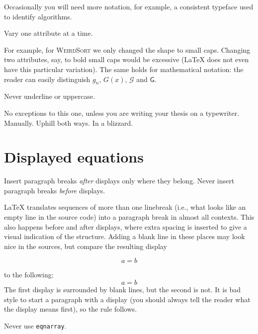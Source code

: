 Occasionally you will need more notation, for example, a consistent
typeface used to identify algorithms.

\begin{Rule}
  Vary one attribute at a time.
\end{Rule}

For example, for \textsc{WeirdSort} we only changed the shape to small
caps.  Changing two attributes, say, to bold small caps would be
excessive (\LaTeX{} does not even have this particular variation).
The same holds for mathematical notation: the reader can easily
distinguish \(g_n\), \(G(x)\), \(\mathcal{G}\) and \(\mathsf{G}\).

\begin{Rule}
  Never underline or uppercase.
\end{Rule}

No exceptions to this one, unless you are writing your thesis on a
typewriter.  Manually.  Uphill both ways.  In a blizzard.


\section{Displayed equations}

\begin{Rule}
  Insert paragraph breaks \emph{after} displays only where they
  belong.  Never insert paragraph breaks \emph{before} displays.
\end{Rule}

\LaTeX{} translates sequences of more than one linebreak (i.e., what
looks like an empty line in the source code) into a paragraph break in
almost all contexts.  This also happens before and after displays,
where extra spacing is inserted to give a visual indication of the
structure.  Adding a blank line in these places may look nice in the
sources, but compare the resulting display

\begin{displaymath}
  a = b
\end{displaymath}

to the following:
\begin{displaymath}
  a = b
\end{displaymath}
The first display is surrounded by blank lines, but the second is not.
It is bad style to start a paragraph with a display (you should always
tell the reader what the display means first), so the rule follows.

\begin{Rule}
  Never use \lstinline-eqnarray-.
\end{Rule}


